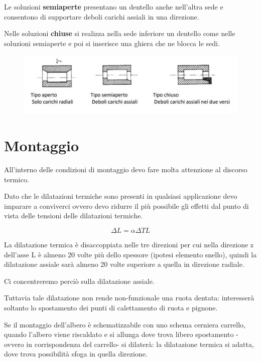 \documentclass[a4paper, 15pt]{article}
\begin{document}
			Le soluzioni \textbf{semiaperte} presentano un dentello anche nell’altra sede e consentono di supportare deboli carichi assiali in una direzione. 
			
			Nelle soluzioni \textbf{chiuse} si realizza nella sede inferiore un dentello come nelle soluzioni semiaperte e poi si inserisce una ghiera che ne blocca le sedi.
			
			
			\begin{figure}[H]				
\centering
				\includegraphics[width=0.5\linewidth]{immagini/screenshot007}
				\label{fig:screenshot007}

			\end{figure}
			
			
			\section{Montaggio}
			
			All’interno delle condizioni di montaggio devo fare molta attenzione al discorso termico.
			
			Dato che le dilatazioni termiche sono presenti in qualsiasi applicazione devo imparare a conviverci ovvero devo ridurre il più possibile gli effetti dal punto di vista delle tensioni delle dilatazioni termiche.
			
			\[\Delta L = \alpha\Delta TL\]
			
			La dilatazione termica è disaccoppiata nelle tre direzioni per cui nella direzione z dell’asse L è almeno 20 volte più dello spessore (ipotesi elemento snello), quindi la dilatazione assiale sarà almeno 20 volte superiore a quella in direzione radiale.
			
			Ci concentreremo perciò sulla dilatazione assiale.
			
			Tuttavia tale dilatazione non rende non-funzionale una ruota dentata: interesserà soltanto lo spostamento dei punti di calettamento di ruota e pignone. 
			
			Se il montaggio dell’albero è schematizzabile con uno schema cerniera carrello, quando l’albero viene riscaldato e si allunga dove trova libero spostamento - ovvero in corrispondenza del carrello- si dilaterà: la dilatazione termica si adatta, dove trova possibilità sfoga in quella direzione.\newline 
			
\end{document}
